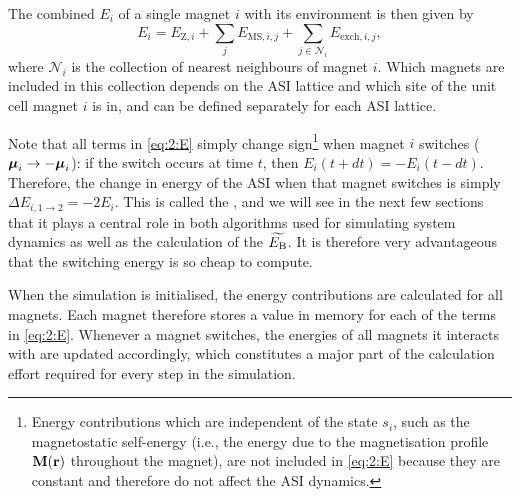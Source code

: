 The combined  $E_i$ of a single magnet $i$ with its environment is then given by
\begin{equation}
	\label{eq:2:E}
	E_i = E_{\mathrm{Z},i} + \sum_j E_{\mathrm{MS},i,j} + \sum_{j \in \mathcal{N}_i} E_{\mathrm{exch},i,j} \mathrm{,}
\end{equation}
where $\mathcal{N}_i$ is the collection of nearest neighbours of magnet $i$.
Which magnets are included in this collection depends on the ASI lattice and which site of the unit cell magnet $i$ is in, and can be defined separately for each ASI lattice. \par
Note that all terms in \cref{eq:2:E} simply change sign\footnote{
	Energy contributions which are independent of the state $s_i$, such as the magnetostatic self-energy (i.e., the energy due to the magnetisation profile $\boldsymbol{\mathbf{M}}(\boldsymbol{\mathbf{r}})$ throughout the magnet), are not included in \cref{eq:2:E} because they are constant and therefore do not affect the ASI dynamics.
} when magnet $i$ switches ($\boldsymbol{\mathbf{\mu}}_i \rightarrow -\boldsymbol{\mathbf{\mu}}_i$): if the switch occurs at time $t$, then $E_i(t + dt) = -E_i(t - dt)$.
Therefore, the change in energy of the ASI when that magnet switches is simply $\Delta E_{i,1\rightarrow2} = -2 E_i$.
This is called the , and we will see in the next few sections that it plays a central role in both algorithms used for simulating system dynamics as well as the calculation of the  $\widetilde{E_\mathrm{B}}$.
It is therefore very advantageous that the switching energy is so cheap to compute. \par
When the simulation is initialised, the energy contributions are calculated for all magnets.
Each magnet therefore stores a value in memory for each of the terms in \cref{eq:2:E}.
Whenever a magnet switches, the energies of all magnets it interacts with are updated accordingly, which constitutes a major part of the calculation effort required for every step in the simulation.

